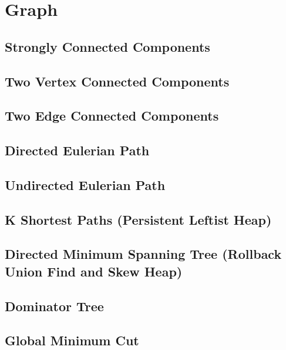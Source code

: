 \section{Graph}

\subsection{Strongly Connected Components}


\subsection{Two Vertex Connected Components}


\subsection{Two Edge Connected Components}


\subsection{Directed Eulerian Path}


\subsection{Undirected Eulerian Path}


\subsection{K Shortest Paths (Persistent Leftist Heap)}


\subsection{Directed Minimum Spanning Tree (Rollback Union Find and Skew Heap)}


\subsection{Dominator Tree}


\subsection{Global Minimum Cut}


